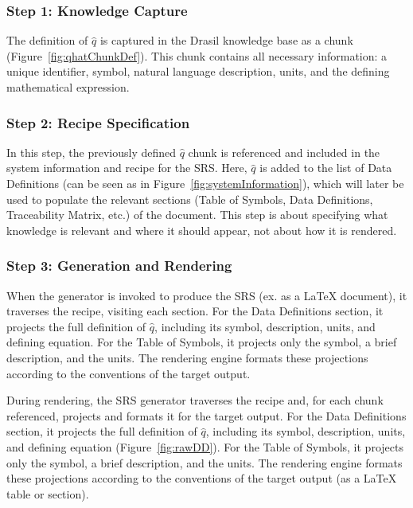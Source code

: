\subsubsection{Step 1: Knowledge Capture}

The definition of $\hat{q}$ is captured in the Drasil knowledge base as a 
chunk (Figure~\ref{fig:qhatChunkDef}). This chunk contains all necessary 
information: a unique identifier, symbol, natural language description, units, 
and the defining mathematical expression.


\subsubsection{Step 2: Recipe Specification}

In this step, the previously defined $\hat{q}$ chunk is referenced and included 
in the system information and recipe for the \gb{} SRS. Here, $\hat{q}$ is 
added to the list of Data Definitions (can be seen as  
in Figure~\ref{fig:systemInformation}), which will later be used to populate 
the relevant sections (Table of Symbols, Data Definitions, Traceability Matrix, 
etc.) of the document. This step is about specifying what 
knowledge is relevant and where it should appear, not about how it is rendered.

\subsubsection{Step 3: Generation and Rendering}
When the generator is invoked to produce the SRS (ex. as a \LaTeX{} document), 
it traverses the recipe, visiting each section. For the Data Definitions 
section, it projects the full definition of $\hat{q}$, including its symbol, 
description, units, and defining equation. For the Table of Symbols, it 
projects only the symbol, a brief description, and the units. The rendering 
engine formats these projections according to the conventions of the target 
output.


During rendering, the SRS generator traverses the recipe and, for each chunk 
referenced, projects and formats it for the target output. 
For the Data Definitions section, it projects the full definition of $\hat{q}$, 
including its symbol, description, units, and defining equation 
(Figure~\ref{fig:rawDD}). For the Table of Symbols, it projects only the 
symbol, a brief description, and the units. The rendering engine formats these 
projections according to the conventions of the target output (as a \LaTeX 
table or section).

